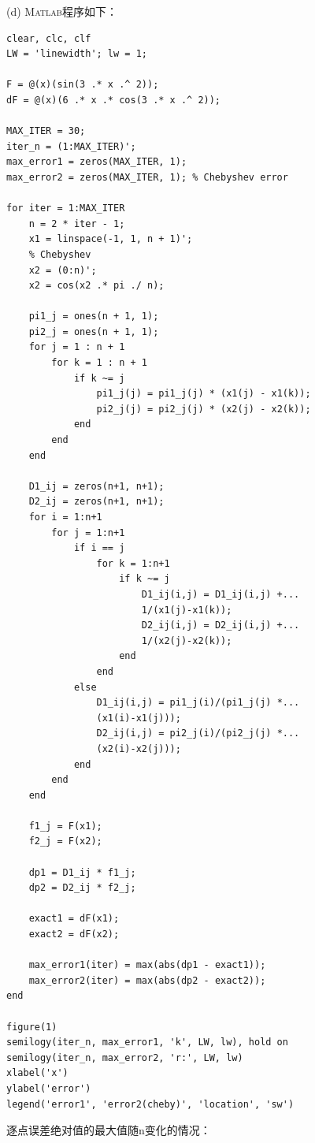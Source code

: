 \documentclass[12pt,a4paper,utf8]{ctexart}
\begin{document}
\begin{enumerate}
\subitem(d)
\textsc{Matlab}程序如下：
\begin{lstlisting}[frame=single]
clear, clc, clf
LW = 'linewidth'; lw = 1;

F = @(x)(sin(3 .* x .^ 2));
dF = @(x)(6 .* x .* cos(3 .* x .^ 2));

MAX_ITER = 30;
iter_n = (1:MAX_ITER)';
max_error1 = zeros(MAX_ITER, 1);
max_error2 = zeros(MAX_ITER, 1); % Chebyshev error

for iter = 1:MAX_ITER
    n = 2 * iter - 1;
    x1 = linspace(-1, 1, n + 1)';
    % Chebyshev
    x2 = (0:n)';
    x2 = cos(x2 .* pi ./ n);
    
    pi1_j = ones(n + 1, 1);
    pi2_j = ones(n + 1, 1);
    for j = 1 : n + 1
        for k = 1 : n + 1
            if k ~= j
                pi1_j(j) = pi1_j(j) * (x1(j) - x1(k));
                pi2_j(j) = pi2_j(j) * (x2(j) - x2(k));
            end
        end
    end

    D1_ij = zeros(n+1, n+1);
    D2_ij = zeros(n+1, n+1);
    for i = 1:n+1
        for j = 1:n+1
            if i == j
                for k = 1:n+1
                    if k ~= j
                        D1_ij(i,j) = D1_ij(i,j) +...
                        1/(x1(j)-x1(k));
                        D2_ij(i,j) = D2_ij(i,j) +...
                        1/(x2(j)-x2(k));
                    end
                end
            else
                D1_ij(i,j) = pi1_j(i)/(pi1_j(j) *...
                (x1(i)-x1(j)));
                D2_ij(i,j) = pi2_j(i)/(pi2_j(j) *...
                (x2(i)-x2(j)));
            end
        end
    end

    f1_j = F(x1);
    f2_j = F(x2);

    dp1 = D1_ij * f1_j;
    dp2 = D2_ij * f2_j;

    exact1 = dF(x1);
    exact2 = dF(x2);

    max_error1(iter) = max(abs(dp1 - exact1));
    max_error2(iter) = max(abs(dp2 - exact2));
end

figure(1)
semilogy(iter_n, max_error1, 'k', LW, lw), hold on
semilogy(iter_n, max_error2, 'r:', LW, lw)
xlabel('x')
ylabel('error')
legend('error1', 'error2(cheby)', 'location', 'sw')
\end{lstlisting}

逐点误差绝对值的最大值随n变化的情况：


\end{enumerate}
\end{document}
